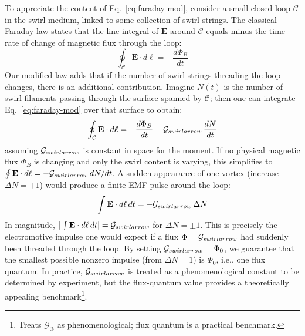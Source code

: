 \documentclass[12pt]{article}
\DeclareRobustCommand{\swirlarrow}{
\mathchoice{\mkern-2mu\scriptstyle\boldsymbol{\circlearrowleft}}%
{\mkern-2mu\scriptstyle\boldsymbol{\circlearrowleft}}%
{\mkern-2mu\scriptscriptstyle\boldsymbol{\circlearrowleft}}%
{\mkern-2mu\scriptscriptstyle\boldsymbol{\circlearrowleft}}
}%
\begin{document}
To appreciate the content of Eq.~\eqref{eq:faraday-mod}, consider a small closed loop $\mathcal{C}$ in the swirl medium, linked to some collection of swirl strings. The classical Faraday law states that the line integral of $\mathbf{E}$ around $\mathcal{C}$ equals minus the time rate of change of magnetic flux through the loop:
\[
\oint_{\mathcal{C}} \mathbf{E}\cdot d\boldsymbol{\ell} = -\frac{d\Phi_{B}}{dt}
\]
Our modified law adds that if the number of swirl strings threading the loop changes, there is an additional contribution. Imagine $N(t)$ is the number of swirl filaments passing through the surface spanned by $\mathcal{C}$; then one can integrate Eq.~\eqref{eq:faraday-mod} over that surface to obtain:
\[
\oint_{\mathcal{C}} \mathbf{E}\cdot d\boldsymbol{\ell} = -\frac{d\Phi_{B}}{dt} - \mathcal{G}_{\\swirlarrow}\,\frac{dN}{dt}
\]
assuming $\mathcal{G}_{\\swirlarrow}$ is constant in space for the moment. If no physical magnetic flux $\Phi_{B}$ is changing and only the swirl content is varying, this simplifies to $\oint \mathbf{E}\cdot d\ell = - \mathcal{G}_{\\swirlarrow}\,dN/dt$. A sudden appearance of one vortex (increase $\Delta N=+1$) would produce a finite EMF pulse around the loop:
\[
\int \mathbf{E}\cdot d\ell\,dt = -\mathcal{G}_{\\swirlarrow}\,\Delta N
\]
In magnitude, $|\int \mathbf{E}\cdot d\ell\,dt| = \mathcal{G}_{\\swirlarrow}$ for $\Delta N = \pm 1$. This is precisely the electromotive impulse one would expect if a flux $\Phi = \mathcal{G}_{\\swirlarrow}$ had suddenly been threaded through the loop. By setting $\mathcal{G}_{\\swirlarrow} = \Phi_{0}$, we guarantee that the smallest possible nonzero impulse (from $\Delta N=1$) is $\Phi_{0}$, i.e., one flux quantum. In practice, $\mathcal{G}_{\\swirlarrow}$ is treated as a phenomenological constant to be determined by experiment, but the flux-quantum value provides a theoretically appealing benchmark\footnote{Treats $\mathcal{G}_{\!\circlearrowleft}$ as phenomenological; flux quantum is a practical benchmark.}.
\end{document}

